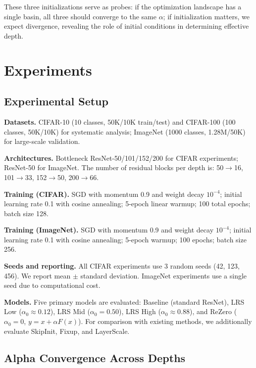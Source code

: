 \documentclass[preprint,12pt]{elsarticle}
\begin{document}
These three initializations serve as probes: if the optimization landscape has a single basin, all three should converge to the same $\alpha$; if initialization matters, we expect divergence, revealing the role of initial conditions in determining effective depth.

\section{Experiments}
\label{sec:experiments}

\subsection{Experimental Setup}
\label{sec:setup}

\textbf{Datasets.} CIFAR-10 (10 classes, 50K/10K train/test) and CIFAR-100 (100 classes, 50K/10K) for systematic analysis; ImageNet (1000 classes, 1.28M/50K) for large-scale validation.

\textbf{Architectures.} Bottleneck ResNet-50/101/152/200 for CIFAR experiments; ResNet-50 for ImageNet. The number of residual blocks per depth is: 50$\to$16, 101$\to$33, 152$\to$50, 200$\to$66.

\textbf{Training (CIFAR).} SGD with momentum 0.9 and weight decay $10^{-4}$; initial learning rate 0.1 with cosine annealing; 5-epoch linear warmup; 100 total epochs; batch size 128.

\textbf{Training (ImageNet).} SGD with momentum 0.9 and weight decay $10^{-4}$; initial learning rate 0.1 with cosine annealing; 5-epoch warmup; 100 epochs; batch size 256.

\textbf{Seeds and reporting.} All CIFAR experiments use 3 random seeds (42, 123, 456). We report mean $\pm$ standard deviation. ImageNet experiments use a single seed due to computational cost.

\textbf{Models.} Five primary models are evaluated: Baseline (standard ResNet), LRS Low ($\alpha_0 \approx 0.12$), LRS Mid ($\alpha_0 = 0.50$), LRS High ($\alpha_0 \approx 0.88$), and ReZero ($\alpha_0 = 0$, $y = x + \alpha F(x)$). For comparison with existing methods, we additionally evaluate SkipInit, Fixup, and LayerScale.

\subsection{Alpha Convergence Across Depths}
\label{sec:alpha_convergence}
\end{document}
